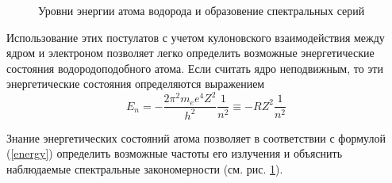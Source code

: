 \documentclass[12pt,a4paper]{article}
\begin{document}
\newpage

\begin{figure} \label{series} 
\vspace{-5ex}  
\caption{Уровни энергии атома водорода и образовение спектральных серий}
\end{figure}

Использование этих постулатов с учетом кулоновского взаимодействия между ядром и электроном позволяет легко определить возможные энергетические состояния водородоподобного атома. Если считать ядро неподвижным, то эти энергетические состояния определяются выражением 
\begin{equation} \label{energy}
E_n = - \frac{2 \pi^2 m_e e^4 Z^2}{h^2} \frac{1}{n^2} \equiv -RZ^2 \frac{1}{n^2}
\end{equation}

Знание энергетических состояний атома позволяет в соответствии с формулой (\ref{energy}) определить возможные частоты его излучения и объяснить наблюдаемые спектральные  закономерности (см. рис. \ref{series}). 
\end{document}
